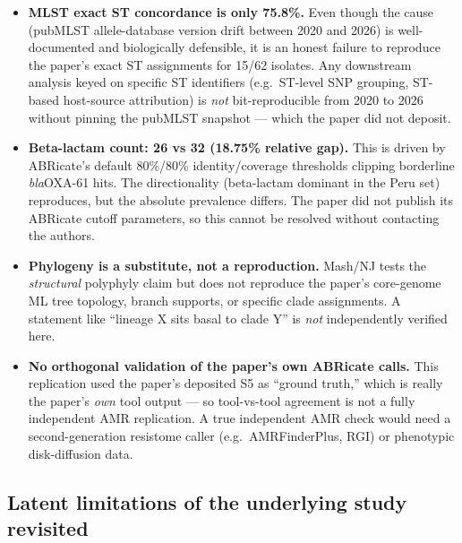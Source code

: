 \documentclass[11pt]{article}
\begin{document}
\begin{itemize}[leftmargin=1.5em]
  \item \textbf{MLST exact ST concordance is only 75.8\%.} Even though the
        cause (pubMLST allele-database version drift between 2020 and 2026)
        is well-documented and biologically defensible, it is an honest failure
        to reproduce the paper's exact ST assignments for 15/62 isolates. Any
        downstream analysis keyed on specific ST identifiers (e.g.\ ST-level
        SNP grouping, ST-based host-source attribution) is \emph{not}
        bit-reproducible from 2020 to 2026 without pinning the pubMLST snapshot
        --- which the paper did not deposit.
  \item \textbf{Beta-lactam count: 26 vs 32 (18.75\% relative gap).} This is
        driven by ABRicate's default 80\%/80\% identity/coverage thresholds
        clipping borderline \emph{bla}OXA-61 hits. The directionality
        (beta-lactam dominant in the Peru set) reproduces, but the absolute
        prevalence differs. The paper did not publish its ABRicate cutoff
        parameters, so this cannot be resolved without contacting the authors.
  \item \textbf{Phylogeny is a substitute, not a reproduction.} Mash/NJ tests
        the \emph{structural} polyphyly claim but does not reproduce the
        paper's core-genome ML tree topology, branch supports, or specific
        clade assignments. A statement like ``lineage X sits basal to clade Y''
        is \emph{not} independently verified here.
  \item \textbf{No orthogonal validation of the paper's own ABRicate calls.}
        This replication used the paper's deposited S5 as ``ground truth,''
        which is really the paper's \emph{own} tool output --- so tool-vs-tool
        agreement is not a fully independent AMR replication. A true independent
        AMR check would need a second-generation resistome caller
        (e.g.\ AMRFinderPlus, RGI) or phenotypic disk-diffusion data.
\end{itemize}

\subsection*{Latent limitations of the underlying study revisited}
\end{document}
